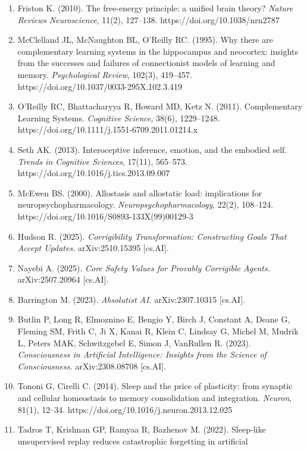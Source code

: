 \documentclass[
]{article}
\begin{document}
\begin{enumerate}
\def\labelenumi{\arabic{enumi}.}
\item
  Friston K. (2010). The free-energy principle: a unified brain theory?
  \emph{Nature Reviews Neuroscience}, 11(2), 127--138.
  https://doi.org/10.1038/nrn2787
\item
  McClelland JL, McNaughton BL, O'Reilly RC. (1995). Why there are
  complementary learning systems in the hippocampus and neocortex:
  insights from the successes and failures of connectionist models of
  learning and memory. \emph{Psychological Review}, 102(3), 419--457.
  https://doi.org/10.1037/0033-295X.102.3.419
\item
  O'Reilly RC, Bhattacharyya R, Howard MD, Ketz N. (2011). Complementary
  Learning Systems. \emph{Cognitive Science}, 38(6), 1229--1248.
  https://doi.org/10.1111/j.1551-6709.2011.01214.x
\item
  Seth AK. (2013). Interoceptive inference, emotion, and the embodied
  self. \emph{Trends in Cognitive Sciences}, 17(11), 565--573.
  https://doi.org/10.1016/j.tics.2013.09.007
\item
  McEwen BS. (2000). Allostasis and allostatic load: implications for
  neuropsychopharmacology. \emph{Neuropsychopharmacology}, 22(2),
  108--124. https://doi.org/10.1016/S0893-133X(99)00129-3
\item
  Hudson R. (2025). \emph{Corrigibility Transformation: Constructing
  Goals That Accept Updates.} arXiv:2510.15395 {[}cs.AI{]}.
\item
  Nayebi A. (2025). \emph{Core Safety Values for Provably Corrigible
  Agents.} arXiv:2507.20964 {[}cs.AI{]}.
\item
  Barrington M. (2023). \emph{Absolutist AI.} arXiv:2307.10315
  {[}cs.AI{]}.
\item
  Butlin P, Long R, Elmoznino E, Bengio Y, Birch J, Constant A, Deane G,
  Fleming SM, Frith C, Ji X, Kanai R, Klein C, Lindsay G, Michel M,
  Mudrik L, Peters MAK, Schwitzgebel E, Simon J, VanRullen R. (2023).
  \emph{Consciousness in Artificial Intelligence: Insights from the
  Science of Consciousness.} arXiv:2308.08708 {[}cs.AI{]}.
\item
  Tononi G, Cirelli C. (2014). Sleep and the price of plasticity: from
  synaptic and cellular homeostasis to memory consolidation and
  integration. \emph{Neuron}, 81(1), 12--34.
  https://doi.org/10.1016/j.neuron.2013.12.025
\item
  Tadros T, Krishnan GP, Ramyaa R, Bazhenov M. (2022). Sleep-like
  unsupervised replay reduces catastrophic forgetting in artificial

\end{enumerate}
\end{document}
